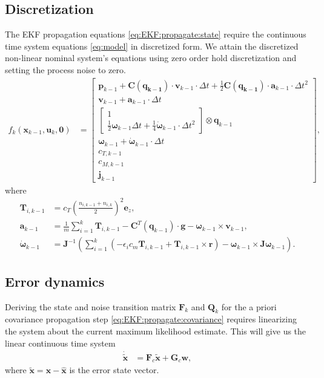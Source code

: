 \documentclass[10pt,a4paper]{article}
\begin{document}
\subsection*{Discretization}
The EKF propagation equations \ref{eq:EKF:propagate:state} require the continuous time system equations \ref{eq:model} in discretized form. We attain the discretized non-linear nominal system's equations using zero order hold discretization and setting the process noise to zero.
\begin{align}
f_k(\mathbf{x}_{k-1},\mathbf{u}_k, \mathbf{0}) &= \begin{bmatrix}
\mathbf{p}_{k-1} + \mathbf{C}(\mathbf{q_{k-1}}) \cdot \mathbf{v}_{k-1} \cdot \Delta t + \frac{1}{2} \mathbf{C}(\mathbf{q_{k-1}}) \cdot \mathbf{a}_{k-1} \cdot \Delta t ^2 \\
\mathbf{v}_{k-1} + \mathbf{a}_{k-1} \cdot \Delta t \\
\begin{bmatrix}
1 \\ \frac{1}{2} \boldsymbol{\omega}_{k-1} \Delta t + \frac{1}{4} \dot{\boldsymbol{\omega}}_{k-1} \cdot \Delta t ^2
\end{bmatrix} \otimes \mathbf{q}_{k-1} \\
\boldsymbol{\omega}_{k-1} + \dot{\boldsymbol{\omega}}_{k-1} \cdot \Delta t \\
c_{T,k-1} \\
c_{M,k-1} \\
\mathbf{j}_{k-1}
\end{bmatrix},
\end{align}
where
\begin{align}
\mathbf{T}_{i,k-1} &= c_T \left( \frac{n_{i,k-1} + n_{i,k}}{2} \right) ^2 \mathbf{e}_z, \\
\mathbf{a}_{k-1} &= \frac{1}{m} \sum_{i=1}^k \mathbf{T}_{i,k-1}  - \mathbf{C}^T(\mathbf{q}_{k-1}) \cdot \mathbf{g} - \boldsymbol{\omega}_{k-1} \times \mathbf{v}_{k-1},  \\
\dot{\boldsymbol{\omega}}_{k-1} &= \mathbf{J}^{-1} \left(  \sum_{i=1}^k \left(-\epsilon_i  c_m \mathbf{T}_{i,k-1} + \mathbf{T}_{i,k-1} \times \mathbf{r} \right) - \boldsymbol{\omega}_{k-1} \times \mathbf{J} \boldsymbol{\omega}_{k-1} \right).
\end{align}

\subsection*{Error dynamics}
Deriving the state and noise transition matrix $\mathbf{F}_k$ and $\mathbf{Q}_k$ for the a priori covariance propagation step \ref{eq:EKF:propagate:covariance} requires linearizing the system about the current maximum likelihood estimate. This will give us the linear continuous time system
\begin{align}
\dot{\tilde{\mathbf{x}}} &= \mathbf{F}_c \tilde{\mathbf{x}} + \mathbf{G}_c \mathbf{w} ,
\end{align}
where $\tilde{\mathbf{x}} = \mathbf{x} - \hat{\mathbf{x}}$ is the error state vector. 
\end{document}
